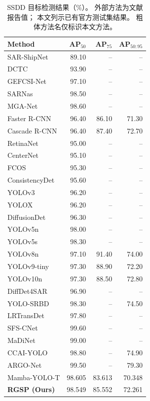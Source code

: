 \documentclass[journal]{IEEEtran}
\begin{document}
\begin{table}[!tbp]
\centering
\small
\setlength{\tabcolsep}{3pt}
\caption{SSDD 目标检测结果（\%）。
外部方法为文献报告值；
本文列示已有官方测试集结果。
粗体方法名仅标识本文方法。}
\label{tab:ssdd_comparison}
\begin{tabular*}{\linewidth}{@{\extracolsep{\fill}}lrrr}
\toprule
Method & AP$_{50}$ & AP$_{75}$ & AP$_{50:95}$ \\
\midrule
SAR-ShipNet       & 89.10 & --    & --    \\
DCTC              & 93.90 & --    & --    \\
GEFCSI-Net        & 97.10 & --    & --    \\
SARNas            & 98.50 & --    & --    \\
MGA-Net           & 98.60 & --    & --    \\
Faster R-CNN      & 96.40 & 86.10 & 71.30 \\
Cascade R-CNN     & 96.40 & 87.40 & 72.70 \\
RetinaNet         & 95.00 & --    & --    \\
CenterNet         & 95.10 & --    & --    \\
FCOS              & 95.30 & --    & --    \\
ConsistencyDet    & 95.60 & --    & --    \\
YOLOv3            & 96.20 & --    & --    \\
YOLOX             & 96.20 & --    & --    \\
DiffusionDet      & 96.30 & --    & --    \\
YOLOv5n           & 98.00 & --    & --    \\
YOLOv5s           & 98.30 & --    & --    \\
YOLOv8n           & 97.10 & 91.40 & 74.00 \\
YOLOv9-tiny       & 97.30 & 88.90 & 72.20 \\
YOLOv10n          & 97.30 & 88.50 & 72.80 \\
DiffDet4SAR       & 96.90 & --    & --    \\
YOLO-SRBD         & 98.30 & --    & 74.50 \\
LRTransDet        & 97.80 & --    & --    \\
SFS-CNet          & 99.60 & --    & --    \\
MaDiNet           & 99.00 & --    & --    \\
CCAI-YOLO         & 98.80 & --    & 74.90 \\
ARGO-Net          & 99.50 & --    & 79.30 \\
\midrule
Mamba-YOLO-T      & 98.605 & 83.613 & 70.348 \\
\textbf{RGSP (Ours)}
                  & 98.549 & 85.552 & 72.261 \\
\bottomrule
\end{tabular*}


\end{table}
\end{document}
